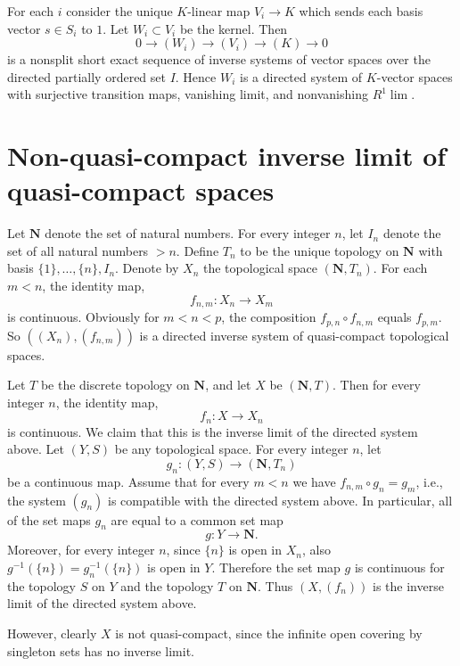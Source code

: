 \medskip\noindent
For each $i$ consider the unique $K$-linear map $V_i \to K$ which sends
each basis vector $s \in S_i$ to $1$. Let $W_i \subset V_i$
be the kernel. Then
$$
0 \to (W_i) \to (V_i) \to (K) \to 0
$$
is a nonsplit short exact sequence of inverse systems of vector spaces
over the directed partially ordered set $I$. Hence
$W_i$ is a directed system of $K$-vector spaces
with surjective transition maps, vanishing limit, and nonvanishing
$R^1\lim$.



\section{Non-quasi-compact inverse limit of quasi-compact spaces}
\label{section-lim-not-quasi-compact}

\noindent
Let $\mathbf{N}$ denote the set of natural numbers.
For every integer $n$, let $I_n$ denote the set of all natural numbers $> n$.
Define $T_n$ to be the unique topology on $\mathbf{N}$ with basis
$\{1\}, \ldots , \{n\}, I_n$.  Denote by $X_n$ the topological space
$(\mathbf{N}, T_n)$.  For each $m < n$, the identity map,
$$
f_{n, m} : X_n \longrightarrow X_m
$$
is continuous.  Obviously for $m < n < p$, the composition
$f_{p, n} \circ f_{n, m}$ equals $f_{p, m}$.  So $((X_n), (f_{n,m}))$
is a directed inverse system of quasi-compact topological spaces.

\medskip\noindent
Let $T$ be the discrete topology on $\mathbf{N}$, and let $X$ be
$(\mathbf{N}, T)$. Then for every integer $n$, the identity map,
$$
f_n : X \longrightarrow X_n
$$
is continuous. We claim that this is the inverse limit of the directed
system above. Let $(Y, S)$ be any topological space. For every integer $n$,
let
$$
g_n : (Y, S) \longrightarrow (\mathbf{N}, T_n)
$$
be a continuous map. Assume that for every $m < n$ we have
$f_{n,m} \circ g_n = g_m$, i.e., the system $(g_n)$ is compatible
with the directed system above. In particular, all of the set maps
$g_n$ are equal to a common set map
$$
g : Y \longrightarrow \mathbf{N}.
$$
Moreover, for every integer $n$, since $\{n\}$ is open in $X_n$,
also $g^{-1}(\{n\}) = g_n^{-1}(\{n\})$ is open in $Y$.
Therefore the set map $g$ is continuous for the topology $S$ on $Y$
and the topology $T$ on $\mathbf{N}$. Thus $(X, (f_n))$ is the inverse
limit of the directed system above.

\medskip\noindent
However, clearly $X$ is not quasi-compact, since the infinite open
covering by singleton sets has no inverse limit.

